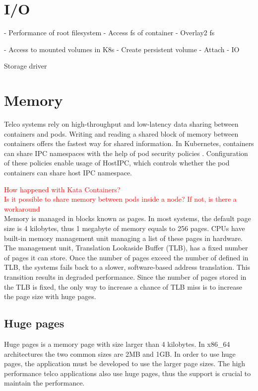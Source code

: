 \section{I/O}

- Performance of root filesystem
	- Access fs of container
	- Overlay2 fs

- Access to mounted volumes in K8s
	- Create persistent volume
	- Attach
	- IO

Storage driver

\section{Memory}

Telco systems rely on high-throughput and low-latency data sharing between containers and pods. Writing and reading a shared block of memory between containers offers the fastest way for shared information. In Kubernetes, containers can share IPC namespaces with the help of pod security policies \cite{PodSecurityPolicyKubernetes}. Configuration of these policies enable usage of HostIPC, which controls whether the pod containers can share host IPC namespace.

\textcolor{red}{How happened with Kata Containers?} \\
\textcolor{red}{Is it possible to share memory between pods inside a node? If not, is there a workaround} \\

Memory is managed in blocks known as pages. In most systems, the default page size is 4 kilobytes, thus 1 megabyte of memory equals to 256 pages. CPUs have built-in memory management unit managing a list of these pages in hardware. The management unit, Translation Lookaside Buffer (TLB), has a fixed number of pages it can store. Once the number of pages exceed the number of defined in TLB, the systems fails back to a slower, software-based address translation. This transition results in degraded performance. Since the number of pages stored in the TLB is fixed, the only way to increase a chance of TLB miss is to increase the page size with huge pages. \cite{HugePagesOpenShift}

\subsection{Huge pages}

Huge pages is a memory page with size larger than 4 kilobytes. In x86\_64 architectures the two common sizes are 2MB and 1GB. In order to use huge pages, the application must be developed to use the larger page sizes. The high performance telco applications also use huge pages, thus the support is crucial to maintain the performance.

